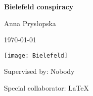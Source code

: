 \begin{titlepage}
\begin{center}

{\Huge \textbf{Bielefeld conspiracy}}
\vspace*{2em}

{\Huge Anna Prysłopska}\\
\vspace*{2em}

{\Huge \today}
\vfill

\texttt{[image: Bielefeld]}
\vfill

Supervised by: Nobody

Special collaborator: \LaTeX

\end{center}
\end{titlepage}